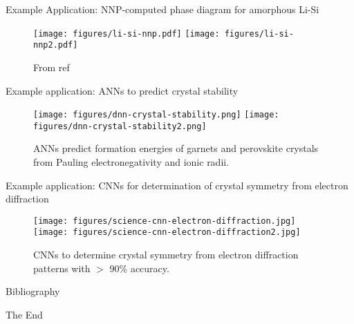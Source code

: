 \documentclass[aspectratio=169]{beamer}
\begin{document}
\begin{frame}{Example Application: NNP-computed phase diagram for amorphous Li-Si}
\begin{figure}
    \centering
    \texttt{[image: figures/li-si-nnp.pdf]}
    \texttt{[image: figures/li-si-nnp2.pdf]}
    \caption{From ref \cite{artrithConstructingFirstprinciplesPhase2018}}
\end{figure}
\end{frame}


\begin{frame}{Example application: ANNs to predict crystal stability}
\begin{figure}
    \centering
    \texttt{[image: figures/dnn-crystal-stability.png]}
    \texttt{[image: figures/dnn-crystal-stability2.png]}
    \caption{ANNs predict formation energies of garnets and perovskite crystals from Pauling electronegativity and ionic radii.\cite{yeDeepNeuralNetworks2018}}
\end{figure}
\end{frame}


\begin{frame}{Example application: CNNs for determination of crystal symmetry from electron diffraction}
\begin{figure}
    \centering
    \texttt{[image: figures/science-cnn-electron-diffraction.jpg]}
    \texttt{[image: figures/science-cnn-electron-diffraction2.jpg]}
    \caption{CNNs to determine crystal symmetry from electron diffraction patterns with $>$ 90\% accuracy.\cite{kaufmannCrystalSymmetryDetermination2020}}
\end{figure}
\end{frame}


\begin{frame}[allowframebreaks]{Bibliography}
    
    
\end{frame}


\begin{frame}
    \Huge{\centerline{The End}}
\end{frame}
\end{document}
